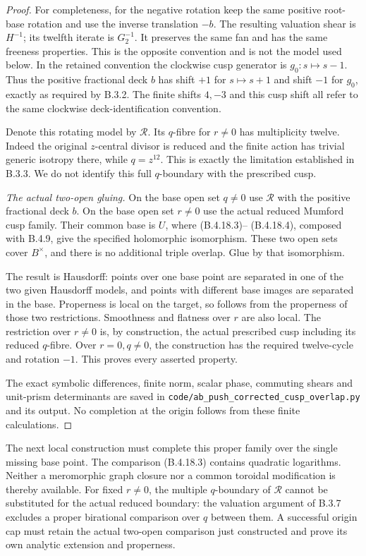 \begin{proof}
For completeness, for the negative rotation keep the same positive
root-base rotation and use the inverse translation
$-b$. The resulting valuation shear is $H^{-1}$;
its twelfth iterate is $G_2^{-1}$. It preserves
the same fan and has the same freeness properties.
This is the opposite convention and is not the model
used below. In the retained convention the clockwise
cusp generator is $g_0:s\mapsto s-1$. Thus the
positive fractional deck $b$ has shift $+1$ for
$s\mapsto s+1$ and shift $-1$ for $g_0$, exactly
as required by B.3.2. The finite shifts $4,-3$
and this cusp shift all refer to the same clockwise
deck-identification convention.

Denote this rotating model by $\mathcal R$.
Its $q$-fibre for $r\ne0$ has multiplicity twelve.
Indeed the original $z$-central divisor is reduced
and the finite action has trivial generic isotropy
there, while $q=z^{12}$. This is exactly the
limitation established in B.3.3. We do not identify
this full $q$-boundary with the prescribed cusp.

\emph{The actual two-open gluing.}
On the base open set $q\ne0$ use $\mathcal R$ with
the positive fractional deck $b$. On the base open set $r\ne0$
use the actual reduced Mumford cusp family.
Their common base is $U$, where (B.4.18.3)--
(B.4.18.4), composed with B.4.9, give the specified
holomorphic isomorphism. These two open sets cover
$B^\times$, and there is no additional triple
overlap. Glue by that isomorphism.

The result is Hausdorff: points over one base
point are separated in one of the two given
Hausdorff models, and points with different
base images are separated in the base.
Properness is local on the target, so follows
from the properness of those two restrictions.
Smoothness and flatness over $r$ are also local.
The restriction over $r\ne0$ is, by construction,
the actual prescribed cusp including its reduced
$q$-fibre. Over $r=0,q\ne0$, the construction has
the required twelve-cycle and rotation $-1$.
This proves every asserted property.

The exact symbolic differences, finite norm,
scalar phase, commuting shears and unit-prism
determinants are saved in
\texttt{code/ab\_push\_corrected\_cusp\_overlap.py}
and its output. No completion at the origin
follows from these finite calculations.
\end{proof}

\begin{remark}
The next local construction must complete this
proper family over the single missing base point.
The comparison (B.4.18.3) contains quadratic
logarithms. Neither a meromorphic graph closure
nor a common toroidal modification is thereby
available. For fixed $r\ne0$, the multiple
$q$-boundary of $\mathcal R$ cannot be substituted
for the actual reduced boundary: the valuation
argument of B.3.7 excludes a proper birational
comparison over $q$ between them. A successful
origin cap must retain the actual two-open
comparison just constructed and prove its own
analytic extension and properness.
\end{remark}
